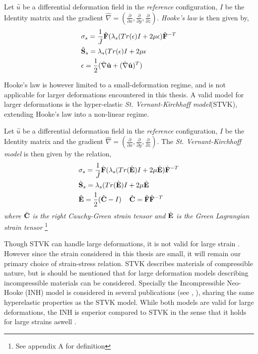 \begin{defn}
Let $\hat{u}$ be a differential deformation field in the \textit{reference} configuration, $I$ be the Identity matrix and the gradient $\hat{\nabla} = (\frac{\partial}{\partial x}, \frac{\partial}{\partial y}, \frac{\partial}{\partial z}) $. \textit{Hooke's law} is then given by,
\begin{align*}
&\sigma_s = \frac{1}{\hat{J}} \hat{\mathbf{F}}(\lambda_s(Tr(\epsilon) I + 2 \mu  \epsilon)\hat{\mathbf{F}}^{-T} \\
&\hat{\mathbf{S}}_s = \lambda_s(Tr(\epsilon) I + 2 \mu \epsilon \\
&\epsilon = \frac{1}{2}(\hat{\nabla} \hat{\mathbf{u}} + (\hat{\nabla} \hat{\mathbf{u}})^T ) 
\end{align*} 
\end{defn}

Hooke's law is however limited to a small-deformation regime, and is not applicable for larger deformations encountered in this thesis. A valid model for larger deformations is the  hyper-elastic \textit{St. Vernant-Kirchhoff model}(STVK), 
extending Hooke's law into a non-linear regime.

 \begin{defn}
Let $\hat{u}$ be a differential deformation field in the \textit{reference} configuration, $I$ be the Identity matrix and the gradient $\hat{\nabla} = (\frac{\partial}{\partial x}, \frac{\partial}{\partial y}, \frac{\partial}{\partial z}) $. The \textit{St. Vernant-Kirchhoff model} is then given by the relation,
\begin{align*}
&\sigma_s = \frac{1}{\hat{J}} \hat{\mathbf{F}}(\lambda_s(Tr(\hat{\mathbf{E}}) I + 2 \mu \hat{\mathbf{E}})\hat{\mathbf{F}}^{-T} \\
&\hat{\mathbf{S}}_s = \lambda_s(Tr(\hat{\mathbf{E}}) I + 2 \mu \hat{\mathbf{E}} \\
&\hat{\mathbf{E}} = \frac{1}{2}(\hat{\mathbf{C}} - I ) \hspace{4mm} \hat{\mathbf{C}} = \hat{\mathbf{F}}\hat{\mathbf{F}}^{-T}
\end{align*} 
\textit{where $\hat{\mathbf{C}}$ is the right Cauchy-Green strain tensor and $\hat{\mathbf{E}}$ is the Green Lagrangian strain tensor} \footnote{See appendix A for definition}
\end{defn}
  

Though STVK can handle large deformations, it is not valid for large strain \cite{Razzaq2010}. However since the strain considered in this thesis are small, it will remain our primary choice of strain-stress relation.  STVK describes materials of compressible nature,  but is should be mentioned that for large deformation models describing incompressible materials can be considered. Specially the Incompressible Neo-Hooke (INH) model is considered in several publications (see \cite{Wick2013}, \cite{Richter2010c}), sharing the same hyperelastic properties as the STVK model. While both models are valid for large deformations, the INH is superior compared to STVK in the sense that it holds for large strains aswell \cite{Razzaq2010}. \newpage

